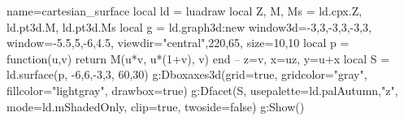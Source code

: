 \documentclass[tikz]{standalone}
\begin{document}
\begin{luadraw}{name=cartesian_surface}
local ld = luadraw
local Z, M, Ms = ld.cpx.Z, ld.pt3d.M, ld.pt3d.Ms
local g = ld.graph3d:new{ window3d={-3,3,-3,3,-3,3}, window={-5.5,5,-6,4.5},
    viewdir={"central",220,65}, size={10,10} }
local p = function(u,v) return M(u*v, u*(1+v), v) end  -- z=v, x=uz, y=u+x
local S = ld.surface(p, -6,6,-3,3, {60,30})
g:Dboxaxes3d({grid=true, gridcolor="gray", fillcolor="lightgray", drawbox=true})
g:Dfacet(S, {usepalette={ld.palAutumn,"z"}, mode=ld.mShadedOnly, clip=true, twoside=false})
g:Show()
\end{luadraw}
\end{document}
